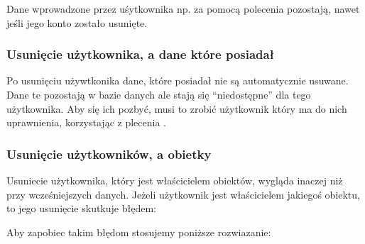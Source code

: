 \documentclass[a4paper,11pt,openany,english]{sphinxmanual}
\begin{document}
\begin{sphinxVerbatim}[commandchars=\\\{\}]
  
\end{sphinxVerbatim}

\sphinxAtStartPar
Dane wprowadzone przez uśytkownika np. za pomocą polecenia  pozostają, nawet jeśli jego konto zostało usunięte.


\subsubsection{Usunięcie użytkownika, a dane które posiadał}
\label{\detokenize{rozdzial2/Bezpieczenstwo/index:usuniecie-uzytkownika-a-dane-ktore-posiadal}}
\sphinxAtStartPar
Po usunięciu używtkonika dane, które posiadał nie są automatycznie usuwane. Dane te pozostają w bazie danych ale stają się “niedostępne” dla tego użytkownika. Aby się ich pozbyć, musi to zrobić użytkownik który ma do nich uprawnienia, korzystając z plecenia .


\subsubsection{Usunięcie użytkowników, a obietky}
\label{\detokenize{rozdzial2/Bezpieczenstwo/index:usuniecie-uzytkownikow-a-obietky}}
\sphinxAtStartPar
Usuniecie użytkownika, który jest właścicielem obiektów, wygląda inaczej niż przy wcześniejszych danych. Jeżeli użytkownik jest właścicielem jakiegoś obiektu, to jego usunięcie skutkuje błędem:

\begin{sphinxVerbatim}[commandchars=\\\{\}]
           
\end{sphinxVerbatim}

\sphinxAtStartPar
Aby zapobiec takim błędom stosujemy poniższe rozwiazanie:

\begin{sphinxVerbatim}[commandchars=\\\{\}]
     
   
  
\end{sphinxVerbatim}
\end{document}
